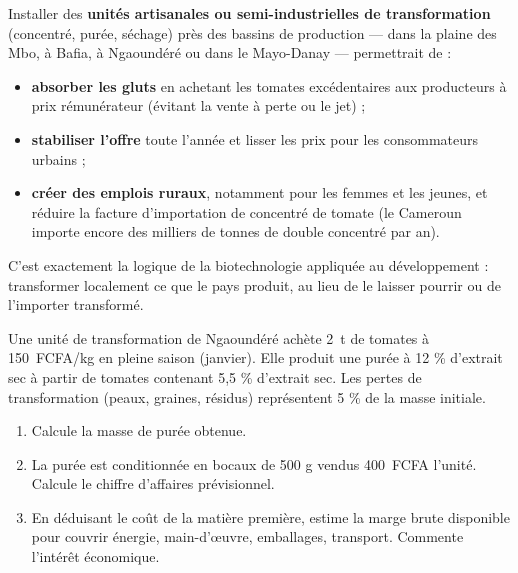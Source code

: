 \documentclass[11pt]{article}
\begin{document}
\begin{savaistu}
Installer des \textbf{unités artisanales ou semi-industrielles de transformation} (concentré, purée, séchage) près des bassins de production — dans la plaine des Mbo, à Bafia, à Ngaoundéré ou dans le Mayo-Danay — permettrait de :
\begin{itemize}
\item \textbf{absorber les gluts} en achetant les tomates excédentaires aux producteurs à prix rémunérateur (évitant la vente à perte ou le jet) ;
\item \textbf{stabiliser l'offre} toute l'année et lisser les prix pour les consommateurs urbains ;
\item \textbf{créer des emplois ruraux}, notamment pour les femmes et les jeunes, et réduire la facture d'importation de concentré de tomate (le Cameroun importe encore des milliers de tonnes de double concentré par an).
\end{itemize}
C'est exactement la logique de la biotechnologie appliquée au développement : transformer localement ce que le pays produit, au lieu de le laisser pourrir ou de l'importer transformé.
\end{savaistu}

\begin{exercice}
Une unité de transformation de Ngaoundéré achète \SI{2}{t} de tomates à \SI{150}{FCFA/kg} en pleine saison (janvier). Elle produit une purée à 12 \% d'extrait sec à partir de tomates contenant 5,5 \% d'extrait sec. Les pertes de transformation (peaux, graines, résidus) représentent 5 \% de la masse initiale.
\begin{enumerate}
\item Calcule la masse de purée obtenue.
\item La purée est conditionnée en bocaux de 500 g vendus \SI{400}{FCFA} l'unité. Calcule le chiffre d'affaires prévisionnel.
\item En déduisant le coût de la matière première, estime la marge brute disponible pour couvrir énergie, main-d'œuvre, emballages, transport. Commente l'intérêt économique.
\end{enumerate}
\end{exercice}
\end{document}
